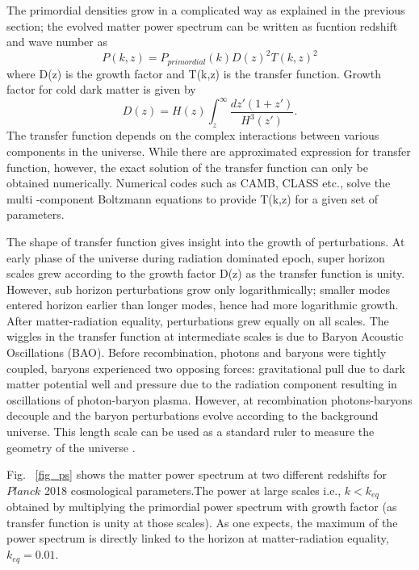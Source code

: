 The primordial densities grow in a complicated way as explained in the previous section; the evolved matter power spectrum can be written as fucntion redshift and wave number as
\begin{equation}
P(k,z) = P_{primordial} (k) D(z)^{2} T(k,z)^{2}
\end{equation}
where D(z) is the growth factor and T(k,z) is the transfer function. 
Growth factor for cold dark matter is given by
\begin{equation}
D(z) = H(z) \int^{\infty}_{z} \frac{dz'(1+z')}{H^{3}(z')}.
\end{equation}
The transfer function depends on the complex interactions between various components in the universe. 
While there are approximated expression for transfer function, however, the exact solution of the transfer function can only be obtained numerically. 
Numerical codes such as CAMB, CLASS etc., solve the multi -component Boltzmann equations to provide T(k,z) for a given set of parameters. 

The shape of transfer function gives insight into the growth of perturbations. At early phase of the universe during radiation dominated epoch, super horizon scales grew according to the growth factor D(z) as the transfer function is unity. However, sub horizon perturbations grow only logarithmically; smaller modes entered horizon earlier than longer modes, hence had more logarithmic growth. After matter-radiation equality, perturbations grew equally on all scales. The wiggles in the transfer function at intermediate scales is due to Baryon Acoustic Oscillations (BAO). Before recombination, photons and baryons were tightly coupled, baryons experienced two opposing forces: gravitational pull due to dark matter potential well and pressure due to the radiation component resulting in oscillations of photon-baryon plasma. However, at recombination photons-baryons decouple and the baryon perturbations evolve according to the background universe. This length scale can be used as a standard ruler to measure the geometry of the universe \cite{chang07}.

Fig. ~\ref{fig_ps} shows the matter power spectrum at two different redshifts for $Planck$ 2018 cosmological parameters.The power at large scales i.e., $k<k_{eq}$ obtained by multiplying the primordial power spectrum with growth factor (as transfer function is unity at those scales). As one expects, the maximum of the power spectrum is directly linked to the horizon at matter-radiation equality, $k_{eq} = 0.01$.  

